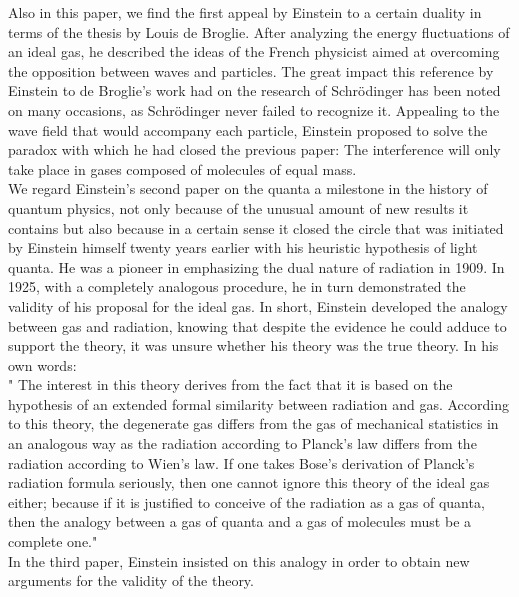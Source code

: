 \documentclass[12pt, letterpaper]{article}
\begin{document}
    Also in this paper, we find the first appeal by Einstein to a certain duality
    in terms of the thesis by Louis de Broglie. After analyzing the energy fluctuations 
    of an ideal gas, he described the ideas of the French physicist aimed at
    overcoming the opposition between waves and particles. The great impact this
    reference by Einstein to de Broglie’s work had on the research of Schrödinger
    has been noted on many occasions, as Schrödinger never failed to recognize it.
    Appealing to the wave field that would accompany each particle, Einstein proposed to solve the paradox with which he had
    closed the previous paper: The
    interference will only take place in gases composed of molecules of equal mass. \\ 

    We regard Einstein’s second paper on the quanta a milestone in the history
    of quantum physics, not only because of the unusual amount of new results
    it contains but also because in a certain sense it closed the circle that was
    initiated by Einstein himself twenty years earlier with his heuristic hypothesis
    of light quanta. He was a pioneer in emphasizing the dual nature of radiation in
    1909. In 1925, with a completely analogous procedure, he in turn demonstrated
    the validity of his proposal for the ideal gas.
    In short, Einstein developed the analogy between gas and radiation, knowing
    that despite the evidence he could adduce to support the theory, it was unsure
    whether his theory was the true theory. In his own words: \\ 
    
    " The interest in this theory derives from the fact that it is based on
    the hypothesis of an extended formal similarity between radiation
    and gas. According to this theory, the degenerate gas differs from
    the gas of mechanical statistics in an analogous way as the radiation
    according to Planck’s law differs from the radiation according to
    Wien’s law. If one takes Bose’s derivation of Planck’s radiation
    formula seriously, then one cannot ignore this theory of the ideal gas
    either; because if it is justified to conceive of the radiation as a gas
    of quanta, then the analogy between a gas of quanta and a gas of
    molecules must be a complete one." \\ 

    In the third paper, Einstein insisted on this
    analogy in order to obtain new arguments for the validity of the theory. \\ 
    
\end{document}
